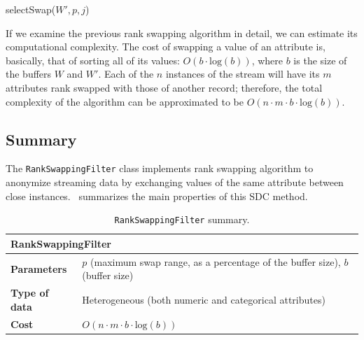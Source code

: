 \begin{procedure}
\caption{selectSwap($W',p,j$)\label{al:select-swap}}
\end{procedure}

If we examine the previous rank swapping algorithm in detail, we can estimate its computational complexity. The cost of swapping a value of an attribute is, basically, that of sorting all of its values: $O(b \cdot \mathrm{log}(b))$, where $b$ is the size of the buffers $W$ and $W'$. Each of the $n$ instances of the stream will have its $m$ attributes rank swapped with those of another record; therefore, the total complexity of the algorithm can be approximated to be $O(n \cdot m \cdot b \cdot \mathrm{log}(b))$.

\subsection{Summary}
\label{Implementation:RankSwapping:Summary}

The \texttt{RankSwappingFilter} class implements rank swapping algorithm to anonymize streaming data by exchanging values of the same attribute between close instances.~ summarizes the main properties of this SDC method.

\begin{table}[h]
	\centering
	\begin{tabular}{@{}ll@{}}
	\toprule
	\multicolumn{2}{l}{\textbf{RankSwappingFilter}}                             \\ \midrule
	\textbf{Parameters}   & $p$ (maximum swap range, as a percentage of the buffer size), $b$ (buffer size) \\
	\textbf{Type of data} & Heterogeneous (both numeric and categorical attributes) \\
	\textbf{Cost}         & $O(n \cdot m \cdot b \cdot \mathrm{log}(b))$  \\ \bottomrule
	\end{tabular}
	\caption{\texttt{RankSwappingFilter} summary.}
	\label{table:rankswapping-summary}
\end{table}